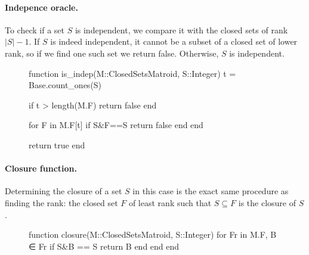 \paragraph{Indepence oracle.} To check if a set $S$ is independent, we compare it with the closed sets of rank $|S|-1$. If $S$ is indeed independent, it cannot be a subset of a closed set of lower rank, so if we find one such set we return false. Otherwise, $S$ is independent.
\pagebreak
\begin{figure}
\begin{jllisting}
function is_indep(M::ClosedSetsMatroid, S::Integer)
  t = Base.count_ones(S)

  if t > length(M.F) return false end

  for F in M.F[t]
    if S&F==S return false end
  end

  return true
end
\end{jllisting}
\end{figure}

\paragraph{Closure function.} Determining the closure of a set $S$ in this case is the exact same procedure as finding the rank: the closed set $F$ of least rank such that $S\subseteq F$ is the closure of $S$.

\begin{figure}
\begin{jllisting}
function closure(M::ClosedSetsMatroid, S::Integer)
  for Fr in M.F, B ∈ Fr
      if S&B == S return B end
  end
end
\end{jllisting}
\end{figure}